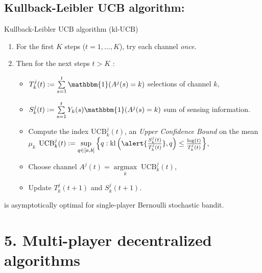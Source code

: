 \documentclass[12pt,english,ignorenonframetext,aspectratio=169,]{beamer}
\providecommand{\tightlist}{%
  \setlength{\itemsep}{0pt}\setlength{\parskip}{0pt}}
\begin{document}




\subsection{\hfill{}Kullback-Leibler UCB algorithm: \klUCB\hfill{}}

\begin{frame}{Kullback-Leibler UCB algorithm
(\(\mathrm{kl}\)-\(\mathrm{UCB}\))}

\begin{enumerate}
\def\labelenumi{\arabic{enumi}.}
\tightlist
\item
  For the first \(K\) steps (\(t=1,\dots,K\)), try each channel
  \emph{once}.
\item
  Then for the next steps \(t > K\) :

  \begin{itemize}
  \tightlist
  \item
  \(T_k^j(t) := \sum\limits_{s=1}^{t} \mathbbm{1}(A^j(s) = k)\) selections of channel \(k\),
  \item
  \(S_k^j(t) := \sum\limits_{s=1}^{t} Y_{k}(s) \mathbbm{1}(A^j(s) = k)\) sum of sensing information.
  \item
    Compute the index \(\mathrm{UCB}_k^j(t)\), an \emph{Upper Confidence Bound} on the mean \(\mu_k\)
    \newline
    \(\mathrm{UCB}_k^j(t) := \sup\limits_{q \in [a, b]} \left\{ q : \mathrm{kl}\left(\alert{\frac{S_k^j(t)}{T_k^j(t)}}, q\right) \leq \frac{\log(t)}{T_k^j(t)} \right\}\),
    \item
    Choose channel \(A^j(t) = \mathop{\arg\max}\limits_{k} \; \mathrm{UCB}_k^j(t)\),
    \item
    Update \(T_k^j(t+1)\) and \(S_k^j(t+1)\).
  \end{itemize}
\end{enumerate}

{\small \klUCB{}
is asymptotically optimal for single-player Bernoulli stochastic bandit.
}

\end{frame}



\section{\hfill{}5. Multi-player decentralized algorithms\hfill{}}
\end{document}

